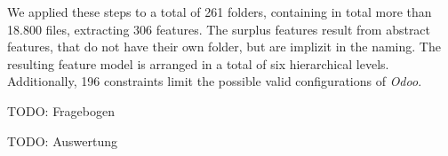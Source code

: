 We applied these steps to a total of 261 folders, containing in total more than 18.800 files, extracting 306 features. The surplus features result from abstract features, that do not have their own folder, but are implizit in the naming. The resulting feature model is arranged in a total of six hierarchical levels. Additionally, 196 constraints limit the possible valid configurations of \textit{Odoo}.


{\color{red}TODO: Fragebogen}

{\color{red}TODO: Auswertung}





%


